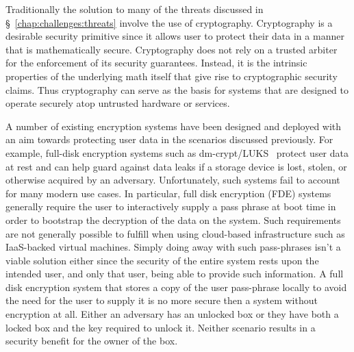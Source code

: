 Traditionally the solution to many of the threats discussed in
\S~\ref{chap:challenges:threats} involve the use of
cryptography. Cryptography is a desirable security primitive since it
allows user to protect their data in a manner that is mathematically
secure. Cryptography does not rely on a trusted arbiter for the
enforcement of its security guarantees. Instead, it is the intrinsic
properties of the underlying math itself that give rise to
cryptographic security claims. Thus cryptography can serve as the basis
for systems that are designed to operate securely atop untrusted
hardware or services.

A number of existing encryption systems have been designed and
deployed with an aim towards protecting user data in the scenarios
discussed previously. For example, full-disk encryption systems such
as dm-crypt/LUKS~\cite{dm-crypt, luks} protect user data at rest and
can help guard against data leaks if a storage device is lost, stolen,
or otherwise acquired by an adversary. Unfortunately, such systems
fail to account for many modern use cases. In particular, full disk
encryption (FDE) systems generally require the user to interactively
supply a pass phrase at boot time in order to bootstrap the decryption
of the data on the system. Such requirements are not generally
possible to fulfill when using cloud-based infrastructure such as
IaaS-backed virtual machines. Simply doing away with such pass-phrases
isn't a viable solution either since the security of the entire system
rests upon the intended user, and only that user, being able to
provide such information. A full disk encryption system that stores a
copy of the user pass-phrase locally to avoid the need for the user to
supply it is no more secure then a system without encryption at
all. Either an adversary has an unlocked box or they have both a
locked box and the key required to unlock it. Neither scenario results
in a security benefit for the owner of the box.


